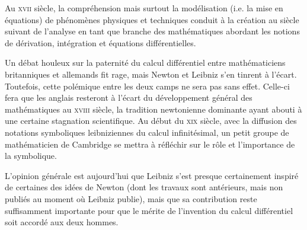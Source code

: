 \begin{histoire}%
Au \textsc{xvii} siècle, la compréhension mais surtout la modélisation (i.e. la mise en équations) de phénomènes physiques et techniques conduit à la création au siècle suivant de l'analyse en tant que branche des mathématiques abordant les notions de dérivation, intégration et équations différentielles.

\medskip
{}

Un débat houleux sur la paternité du calcul différentiel entre mathématiciens britanniques et allemands fit rage, mais Newton et Leibniz s'en tinrent à l'écart.
Toutefois, cette polémique entre les deux camps ne sera pas sans effet.
Celle-ci fera que les anglais resteront à l'écart du développement général des mathématiques au \textsc{xviii} siècle, la tradition newtonienne dominante ayant abouti à une certaine stagnation scientifique. Au début du \textsc{xix} siècle, avec la diffusion des notations symboliques leibniziennes du calcul infinitésimal, un petit groupe de mathématicien de Cambridge se mettra à réfléchir sur le rôle et l'importance de la symbolique.

\medskip
L'opinion générale est aujourd'hui que Leibniz s'est presque certainement inspiré de certaines des idées de Newton (dont les travaux sont antérieurs, mais non publiés au moment où Leibniz publie), mais que sa contribution reste suffisamment importante pour que le mérite de l'invention du calcul différentiel soit accordé aux deux hommes.


\end{histoire}
